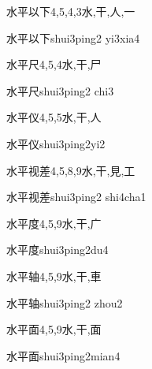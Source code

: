 \begin{Entry}{水平以下}{4,5,4,3}{⽔,⼲,⼈,⼀}
  \begin{Phonetics}{水平以下}{shui3ping2 yi3xia4}
  \end{Phonetics}
\end{Entry}

\begin{Entry}{水平尺}{4,5,4}{⽔,⼲,⼫}
  \begin{Phonetics}{水平尺}{shui3ping2 chi3}
  \end{Phonetics}
\end{Entry}

\begin{Entry}{水平仪}{4,5,5}{⽔,⼲,⼈}
  \begin{Phonetics}{水平仪}{shui3ping2yi2}
  \end{Phonetics}
\end{Entry}

\begin{Entry}{水平视差}{4,5,8,9}{⽔,⼲,⾒,⼯}
  \begin{Phonetics}{水平视差}{shui3ping2 shi4cha1}
  \end{Phonetics}
\end{Entry}

\begin{Entry}{水平度}{4,5,9}{⽔,⼲,⼴}
  \begin{Phonetics}{水平度}{shui3ping2du4}
  \end{Phonetics}
\end{Entry}

\begin{Entry}{水平轴}{4,5,9}{⽔,⼲,⾞}
  \begin{Phonetics}{水平轴}{shui3ping2 zhou2}
  \end{Phonetics}
\end{Entry}

\begin{Entry}{水平面}{4,5,9}{⽔,⼲,⾯}
  \begin{Phonetics}{水平面}{shui3ping2mian4}
  \end{Phonetics}
\end{Entry}


